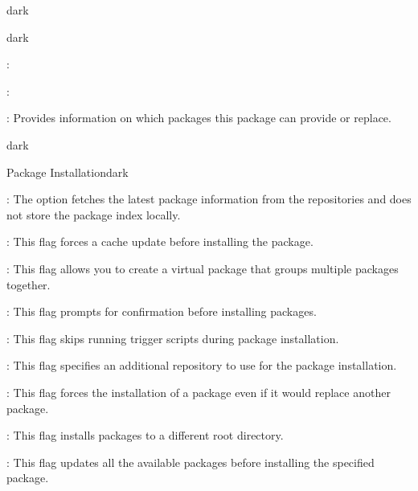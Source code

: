 \begin{baseBoxThree}{}{dark}
\begin{baseBoxThree}{}{dark}
\begin{posnexItemize}
            \item[\bTA] \bT{}
            \item[\sA] :
            \item[\bTA] \bT{}
            \item[\sA] :
            \item[\bTA] \bT{}
            \item[\sA] : Provides information on which packages this package can provide or replace. 
            \item[\bTA] 
        \end{posnexItemize}
    \end{baseBoxThree}
    \smallskip
\end{baseBoxThree}

\begin{baseBoxThree}{}{dark}
    \begin{baseBoxThree}{Package Installation}{dark}
        \smallskip
        \label{apk add}
        \begin{posnexItemize}
            \item[\sA] : The option fetches the latest package information from the repositories and does not store the package index locally.
            \item[\sA] : This flag forces a cache update before installing the package.
            \item[\sA] : This flag allows you to create a virtual package that groups multiple packages together.
            \item[\sA] : This flag prompts for confirmation before installing packages.
            \item[\sA] : This flag skips running trigger scripts during package installation.
            \item[\sA] : This flag specifies an additional repository to use for the package installation.
            \item[\sA] : This flag forces the installation of a package even if it would replace another package.
            \item[\sA] : This flag installs packages to a different root directory.
            \item[\sA] : This flag updates all the available packages before installing the specified package.

\end{posnexItemize}
\end{baseBoxThree}
\end{baseBoxThree}
